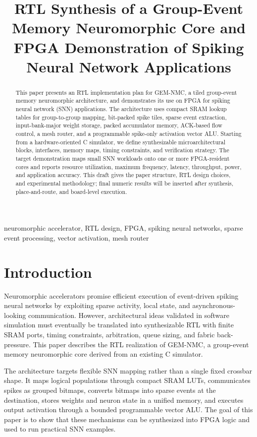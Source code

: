 \documentclass[10pt,conference]{IEEEtran}
\title{RTL Synthesis of a Group-Event Memory Neuromorphic Core and FPGA Demonstration of Spiking Neural Network Applications}
\author{%
\IEEEauthorblockN{Author Name(s)}
\IEEEauthorblockA{Affiliation\\
Email}
}
\newcommand{\arch}{GEM-NMC}
\begin{document}
\maketitle

\begin{abstract}
This paper presents an RTL implementation plan for \arch{}, a tiled group-event memory neuromorphic architecture, and demonstrates its use on FPGA for spiking neural network (SNN) applications. The architecture uses compact SRAM lookup tables for group-to-group mapping, bit-packed spike tiles, sparse event extraction, input-bank-major weight storage, packed accumulator memory, ACK-based flow control, a mesh router, and a programmable spike-only activation vector ALU. Starting from a hardware-oriented C simulator, we define synthesizable microarchitectural blocks, interfaces, memory maps, timing constraints, and verification strategy. The target demonstration maps small SNN workloads onto one or more FPGA-resident cores and reports resource utilization, maximum frequency, latency, throughput, power, and application accuracy. This draft gives the paper structure, RTL design choices, and experimental methodology; final numeric results will be inserted after synthesis, place-and-route, and board-level execution.
\end{abstract}

\begin{IEEEkeywords}
neuromorphic accelerator, RTL design, FPGA, spiking neural networks, sparse event processing, vector activation, mesh router
\end{IEEEkeywords}

\section{Introduction}
Neuromorphic accelerators promise efficient execution of event-driven spiking neural networks by exploiting sparse activity, local state, and asynchronous-looking communication. However, architectural ideas validated in software simulation must eventually be translated into synthesizable RTL with finite SRAM ports, timing constraints, arbitration, queue sizing, and fabric back-pressure. This paper describes the RTL realization of \arch{}, a group-event memory neuromorphic core derived from an existing C simulator.

The architecture targets flexible SNN mapping rather than a single fixed crossbar shape. It maps logical populations through compact SRAM LUTs, communicates spikes as grouped bitmaps, converts bitmaps into sparse events at the destination, stores weights and neuron state in a unified memory, and executes output activation through a bounded programmable vector ALU. The goal of this paper is to show that these mechanisms can be synthesized into FPGA logic and used to run practical SNN examples.
\end{document}
